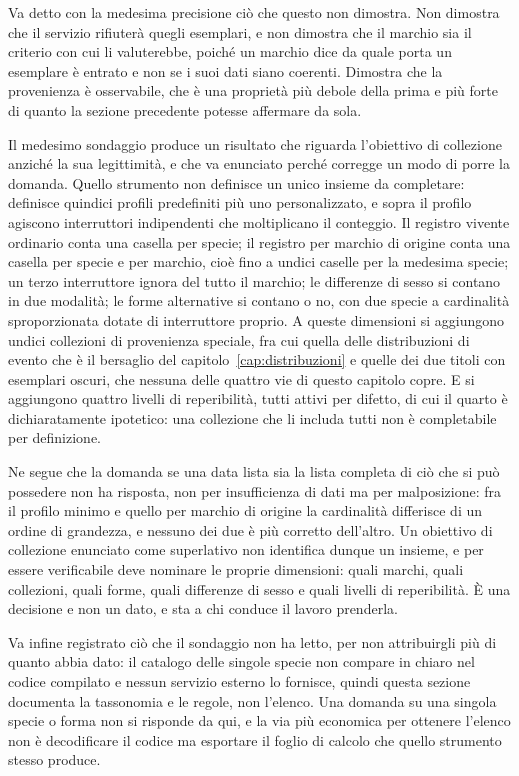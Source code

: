 Va detto con la medesima precisione ciò che questo non dimostra. Non dimostra che il servizio rifiuterà quegli esemplari, e non dimostra che il marchio sia il criterio con cui li valuterebbe, poiché un marchio dice da quale porta un esemplare è entrato e non se i suoi dati siano coerenti. Dimostra che la provenienza è osservabile, che è una proprietà più debole della prima e più forte di quanto la sezione precedente potesse affermare da sola.

Il medesimo sondaggio produce un risultato che riguarda l'obiettivo di collezione anziché la sua legittimità, e che va enunciato perché corregge un modo di porre la domanda. Quello strumento non definisce un unico insieme da completare: definisce quindici profili predefiniti più uno personalizzato, e sopra il profilo agiscono interruttori indipendenti che moltiplicano il conteggio. Il registro vivente ordinario conta una casella per specie; il registro per marchio di origine conta una casella per specie e per marchio, cioè fino a undici caselle per la medesima specie; un terzo interruttore ignora del tutto il marchio; le differenze di sesso si contano in due modalità; le forme alternative si contano o no, con due specie a cardinalità sproporzionata dotate di interruttore proprio. A queste dimensioni si aggiungono undici collezioni di provenienza speciale, fra cui quella delle distribuzioni di evento che è il bersaglio del capitolo~\ref{cap:distribuzioni} e quelle dei due titoli con esemplari oscuri, che nessuna delle quattro vie di questo capitolo copre. E si aggiungono quattro livelli di reperibilità, tutti attivi per difetto, di cui il quarto è dichiaratamente ipotetico: una collezione che li includa tutti non è completabile per definizione.

Ne segue che la domanda se una data lista sia la lista completa di ciò che si può possedere non ha risposta, non per insufficienza di dati ma per malposizione: fra il profilo minimo e quello per marchio di origine la cardinalità differisce di un ordine di grandezza, e nessuno dei due è più corretto dell'altro. Un obiettivo di collezione enunciato come superlativo non identifica dunque un insieme, e per essere verificabile deve nominare le proprie dimensioni: quali marchi, quali collezioni, quali forme, quali differenze di sesso e quali livelli di reperibilità. È una decisione e non un dato, e sta a chi conduce il lavoro prenderla.

Va infine registrato ciò che il sondaggio non ha letto, per non attribuirgli più di quanto abbia dato: il catalogo delle singole specie non compare in chiaro nel codice compilato e nessun servizio esterno lo fornisce, quindi questa sezione documenta la tassonomia e le regole, non l'elenco. Una domanda su una singola specie o forma non si risponde da qui, e la via più economica per ottenere l'elenco non è decodificare il codice ma esportare il foglio di calcolo che quello strumento stesso produce.

